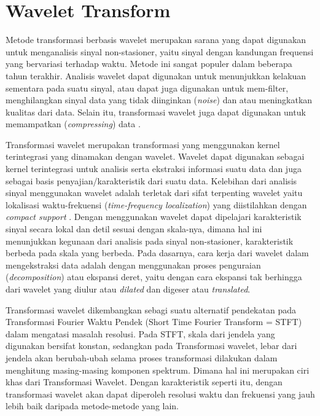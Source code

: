 \section{Wavelet Transform}
\label{sec:wt}

Metode transformasi berbasis wavelet merupakan sarana yang dapat digunakan untuk
menganalisis sinyal non-stasioner, yaitu sinyal dengan kandungan frequensi yang
bervariasi terhadap waktu. Metode ini sangat populer dalam beberapa tahun
terakhir. Analisis wavelet dapat digunakan untuk menunjukkan kelakuan sementara
pada suatu sinyal, atau dapat juga digunakan untuk mem-filter, menghilangkan
sinyal data yang tidak diinginkan (\emph{noise}) dan atau meningkatkan kualitas
dari data. Selain itu, transformasi wavelet juga dapat digunakan untuk
memampatkan (\emph{compressing}) data \cite{Agfi:2006}.

Transformasi wavelet merupakan transformasi yang menggunakan kernel terintegrasi
yang dinamakan dengan wavelet. Wavelet dapat digunakan sebagai kernel
terintegrasi untuk analisis serta ekstraksi informasi suatu data dan juga
sebagai basis penyajian/karakteristik dari suatu data. Kelebihan dari analisis
sinyal menggunakan wavelet adalah terletak dari sifat terpenting wavelet yaitu
lokalisasi waktu-frekuensi (\emph{time-frequency localization}) yang
diistilahkan dengan \emph{compact support} \cite{guler:2005}. Dengan menggunakan
wavelet dapat dipelajari karakteristik sinyal secara lokal dan detil sesuai dengan skala-nya,
dimana hal ini menunjukkan kegunaan dari analisis pada sinyal non-stasioner,
karakteristik berbeda pada skala yang berbeda. Pada dasarnya, cara kerja dari
wavelet dalam mengekstraksi data adalah dengan menggunakan proses penguraian
(\emph{decomposition}) atau ekspansi deret, yaitu dengan cara ekspansi tak
berhingga dari wavelet yang diulur atau \emph{dilated} dan digeser atau
\emph{translated}.


Transformasi wavelet dikembangkan sebagi suatu alternatif pendekatan pada
Transformasi Fourier Waktu Pendek (Short Time Fourier Transform = STFT) dalam
mengatasi masalah resolusi. Pada STFT, skala dari jendela yang
digunakan bersifat konstan, sedangkan pada Transformasi wavelet, lebar dari
jendela akan berubah-ubah selama proses transformasi dilakukan dalam menghitung
masing-masing komponen spektrum. Dimana hal ini merupakan ciri khas dari
Transformasi Wavelet. Dengan karakteristik seperti itu, dengan transformasi
wavelet akan dapat diperoleh resolusi waktu dan frekuensi yang jauh lebih baik
daripada metode-metode yang lain.

